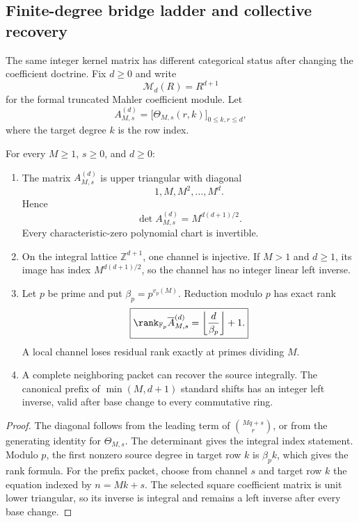 \subsection{Finite-degree bridge ladder and collective recovery}
\label{subsec:block08-finite-degree}

The same integer kernel matrix has different categorical status after changing the coefficient doctrine.  Fix \(d\geq0\) and write
\[
 \mathcal M_d(R)=R^{d+1}
\]
for the formal truncated Mahler coefficient module.  Let
\[
 A_{M,s}^{(d)}
 =\bigl[\Theta_{M,s}(r,k)\bigr]_{0\leq k,r\leq d},
\]
where the target degree \(k\) is the row index.

\begin{theorem}
\label{thm:block08-channel-ladder}
For every \(M\geq1\), \(s\geq0\), and \(d\geq0\):
\begin{enumerate}
\item The matrix \(A_{M,s}^{(d)}\) is upper triangular with diagonal
\[
 1,M,M^2,\ldots,M^d.
\]
Hence
\[
 \boxed{\det A_{M,s}^{(d)}=M^{d(d+1)/2}.}
\]
Every characteristic-zero polynomial chart is invertible.
\item On the integral lattice \(\mathbb Z^{d+1}\), one channel is injective.  If \(M>1\) and \(d\geq1\), its image has index \(M^{d(d+1)/2}\), so the channel has no integer linear left inverse.
\item Let \(p\) be prime and put \(\beta_p=p^{v_p(M)}\).  Reduction modulo \(p\) has exact rank
\[
 \boxed{
 \rank_{\mathbb F_p}\overline A_{M,s}^{(d)}
 =\left\lfloor\frac d{\beta_p}\right\rfloor+1.}
\]
A local channel loses residual rank exactly at primes dividing \(M\).
\item A complete neighboring packet can recover the source integrally.  The canonical prefix of \(\min(M,d+1)\) standard shifts has an integer left inverse, valid after base change to every commutative ring.
\end{enumerate}
\end{theorem}

\begin{proof}
The diagonal follows from the leading term of \(\binom{Mq+s}{r}\), or from the generating identity for \(\Theta_{M,s}\).  The determinant gives the integral index statement.  Modulo \(p\), the first nonzero source degree in target row \(k\) is \(\beta_pk\), which gives the rank formula.  For the prefix packet, choose from channel \(s\) and target row \(k\) the equation indexed by \(n=Mk+s\).  The selected square coefficient matrix is unit lower triangular, so its inverse is integral and remains a left inverse after every base change.
\end{proof}

